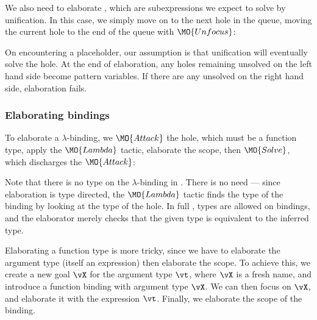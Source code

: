 We also need to elaborate , which are subexpressions we expect to
solve by unification. In this case, we simply move on to the next hole in the queue, moving
the current hole to the end of the queue with $\MO{Unfocus}$:


On encountering a placeholder, our assumption is that unification will eventually solve
the hole. At the end of elaboration, any holes remaining unsolved on the left hand side
become pattern variables. If there are any unsolved on the right hand side, elaboration
fails.

\subsubsection{Elaborating bindings}

To elaborate a $\lambda$-binding, we $\MO{Attack}$ the hole, which must be a function type,
apply the $\MO{Lambda}$ tactic, elaborate the scope, then $\MO{Solve}$, which discharges
the $\MO{Attack}$:


Note that there is no type on the $\lambda$-binding in \IdrisM{}. There is no need --- since
elaboration is type directed, the $\MO{Lambda}$ tactic finds the type of the binding by
looking at the type of the hole. In full \Idris{}, types are allowed on bindings, and the
elaborator merely checks that the given type is equivalent to the inferred type.

Elaborating a function type is more tricky, since we have to elaborate the argument
type (itself an \IdrisM{} expression) then elaborate the scope. To achieve this, we
create a new goal $\vX$ for the argument type $\vt$, where $\vX$ is a fresh name,
and introduce a function binding with argument type $\vX$. We can then focus on
$\vX$, and elaborate it with the expression $\vt$. Finally, we elaborate the
scope of the binding.


